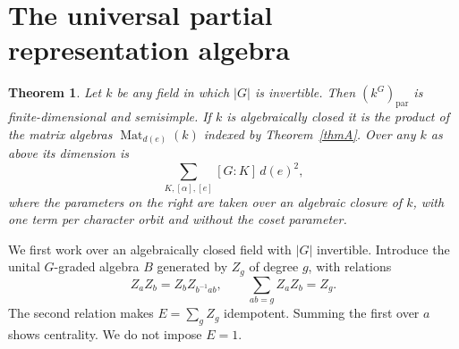 \documentclass[11pt]{amsart}
\newtheorem{theorem}{Theorem}
\theoremstyle{definition}
\DeclareMathOperator{\Mat}{Mat}
\begin{document}
\section{The universal partial representation algebra}
\renewcommand{\thetheorem}{B}
\begin{theorem}\label{thmB}
Let $k$ be any field in which $|G|$ is invertible. Then $(k^G)_{\mathrm{par}}$ is finite-dimensional and semisimple. If $k$ is algebraically closed it is the product of the matrix algebras $\Mat_{d(e)}(k)$ indexed by Theorem~\ref{thmA}. Over any $k$ as above its dimension is
\[
 \sum_{K,[\alpha],[e]} [G:K]\,d(e)^2,
\]
where the parameters on the right are taken over an algebraic closure of $k$, with one term per character orbit and without the coset parameter.
\end{theorem}

We first work over an algebraically closed field with $|G|$ invertible. Introduce the unital $G$-graded algebra $B$ generated by $Z_g$ of degree $g$, with relations
\begin{equation}\label{Brel}
 Z_aZ_b=Z_b Z_{b^{-1}ab},\qquad
 \sum_{ab=g} Z_aZ_b=Z_g .
\end{equation}
The second relation makes $E=\sum_gZ_g$ idempotent. Summing the first over $a$ shows centrality. We do not impose $E=1$.
\end{document}
